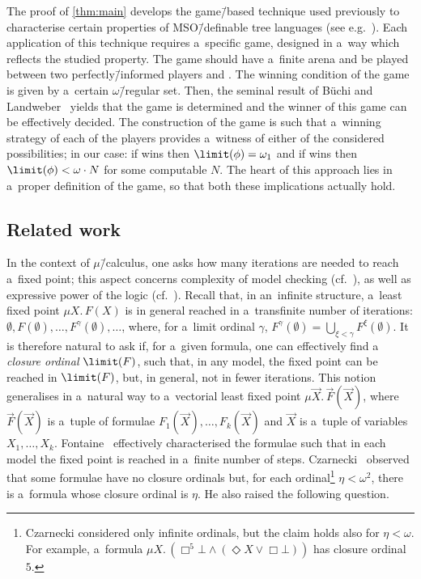 The proof of \cref{thm:main} develops the game\=/based technique used previously to characterise certain properties of MSO\=/definable tree languages (see e.g.~\cite{clemente_separability,walukiewicz_buchi}).
Each application of this technique requires a~specific game, designed in a~way which reflects the studied property.
The game should have a~finite arena and be played between two perfectly\=/informed players \eve and \adam.
The winning condition of the game is given by a~certain $\omega$\=/regular set.
Then, the seminal result of Büchi and Landweber~\cite{buchi_synthesis} yields that the game is determined and the winner of this game can be effectively decided.
The construction of the game is such that a~winning strategy of each of the players provides a~witness of either of the considered possibilities; in our case:
if \eve wins then $\limit(\phi)=\omega_1$ and if \adam wins then $\limit(\phi) < \omega\cdot N$ for some computable $N$.
The heart of this approach lies in a~proper definition of the game, so that both these implications actually hold.


\subsection*{Related work}

In the context of $\mu$\=/calculus, one asks how many iterations are needed to reach a~fixed point;
this aspect concerns complexity of model checking (cf.~\cite{julian-igor-handook,esparza-acceleration}), as well as expressive power of the logic (cf.~\cite{julian-igor-handook,bradfield_transfinite}).
Recall that, in an~infinite structure, a~least fixed point $\mu X.\, F(X)$ is in general reached in a~transfinite number of iterations:
$\emptyset, F(\emptyset),\ldots, F^{\gamma}(\emptyset), \ldots$, where, for a~limit ordinal $\gamma$, $F^{\gamma}(\emptyset) = \bigcup_{\xi < \gamma} F^{\xi}(\emptyset)$.
It is therefore natural to ask if, for a~given formula, one can effectively find a \emph{closure ordinal} $\limit(F)$,
such that, in any model, the fixed point can be reached in $\limit(F)$, but, in general, not in fewer iterations.
This notion generalises in a~natural way to a~vectorial least fixed point $\mu \vec{X}.\,\vec{F}(\vec{X})$,
where $\vec{F}(\vec{X})$ is a~tuple of formulae $F_1(\vec{X}),\dots,F_k(\vec{X})$ and $\vec{X}$ is a~tuple of variables $X_1,\dots,X_k$.
Fontaine~\cite{fontaine_continuous} effectively characterised the formulae such that in each model the fixed point is reached in a~finite number of steps.
Czarnecki~\cite{czarnecki_closure_fics} observed that some formulae have no closure ordinals but, for each ordinal\footnote{Czarnecki considered only infinite ordinals, but the claim holds also for $\eta < \omega$. For example, a~formula $\mu X.\, \left(\Box^5 \bot \wedge(\Diamond X \vee \Box \bot) \right)$ has closure ordinal $5$.} $\eta < \omega^2$, there is a~formula whose closure ordinal is $\eta$.
He also raised the following question.

